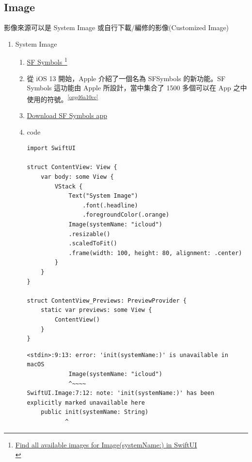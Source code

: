 \documentclass[a4paper,12pt]{article}
\begin{document}
\subsection{Image}
\label{sec:org65d563f}
影像來源可以是 System Image 或自行下載/編修的影像(Customized Image)\\
\begin{enumerate}
\item System Image
\label{sec:org7c567cf}
\begin{enumerate}
\item \href{https://developer.apple.com/design/human-interface-guidelines/sf-symbols/overview/}{SF Symbols }\footnote{\href{https://stackoverflow.com/questions/56514998/find-all-available-images-for-imagesystemname-in-swiftui}{Find all available images for Image(systemName:) in SwiftUI}\\}
\label{sec:orgfa6a63c}
\item 從 iOS 13 開始，Apple 介紹了一個名為 SFSymbols 的新功能。SF Symbols 這功能由 Apple 所設計，當中集合了 1500 多個可以在 App 之中使用的符號。\textsuperscript{\ref{orgd6a10cc}}
\label{sec:org840b993}
\item \href{https://developer.apple.com/design/resources/}{Download SF Symbols app}
\label{sec:org2da8446}
\item code
\label{sec:org84db0c0}
\lstset{breaklines=true,language=swift,label= ,caption= ,captionpos=b,firstnumber=1,numbers=left}
\begin{lstlisting}
import SwiftUI

struct ContentView: View {
    var body: some View {
        VStack {
            Text("System Image")
                .font(.headline)
                .foregroundColor(.orange)
            Image(systemName: "icloud")
            .resizable()
            .scaledToFit()
            .frame(width: 100, height: 80, alignment: .center)
        }
    }
}

struct ContentView_Previews: PreviewProvider {
    static var previews: some View {
        ContentView()
    }
}
\end{lstlisting}

\begin{verbatim}
<stdin>:9:13: error: 'init(systemName:)' is unavailable in macOS
            Image(systemName: "icloud")
            ^~~~~
SwiftUI.Image:7:12: note: 'init(systemName:)' has been explicitly marked unavailable here
    public init(systemName: String)
           ^
\end{verbatim}


\end{enumerate}
\end{enumerate}
\end{document}
